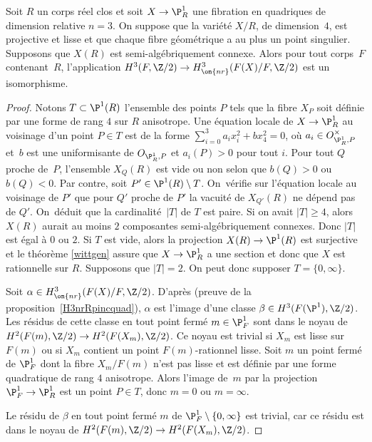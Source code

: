\begin{prop}\label{fibP1Rrel3}
Soit $R$ un corps réel clos et soit $X\to \P^1_{R}$ une fibration en quadriques de dimension relative $n= 3$.
On suppose que la variété $X/R$, de dimension~$4$, est projective et lisse
et que chaque fibre géométrique a au plus un point singulier. Supposons que $X(R)$ est semi-algébriquement connexe.
Alors pour tout corps~$F$ contenant~$R$,
l'application $H^3(F,\Z/2) \to H^3_{\on{nr}}(F(X)/F, \Z/2)$ est
un isomorphisme.
\end{prop}
\begin{proof}

Notons $T\subset \P^1(R)$ l'ensemble des points $P$ tels que la fibre $X_P$ soit définie par une forme de rang $4$ sur $R$ anisotrope. Une équation locale de $X\to \P^1_R$ au voisinage d'un point $P\in T$ est de la forme $\sum_{i=0}^3 a_ix_i^2+bx_4^2=0$, où $a_i\in O_{\P^1_R,P}^\times$ et~$b$ est une uniformisante de $O_{\P^1_R,P}$ et $a_i(P)>0$ pour tout $i$.
Pour tout $Q$ proche de~$P$, l'ensemble $X_Q(R)$ est vide ou non selon que $b(Q)>0$ ou $b(Q)<0$. Par contre, soit $P'\in \P^1(R)\setminus T$. On~vérifie sur l'équation locale au voisinage de $P'$ que pour $Q'$ proche de $P'$ la vacuité de $X_{Q'}(R)$ ne dépend pas de $Q'$. On~déduit que la cardinalité~$|T|$ de $T$ est paire. Si on avait $|T|\geq 4$, alors $X(R)$ aurait au moins $2$ composantes semi-algébriquement connexes. Donc $|T|$ est égal à $0$ ou $2$. Si $T$ est vide, alors la projection $X(R) \to \P^1(R)$ est surjective
et le théorème \ref{wittgen} assure que $X \to \P^1_{R}$ a une section
et donc que $X$ est rationnelle sur $R$.
Supposons que $|T|=2$.
On peut donc supposer $T=\{0,\infty\}$.

Soit $\alpha \in H^3_{\on{nr}}(F(X)/F, \Z/2)$. D'après \cite[Th.\,5]{kahn1998unramified} (\cf preuve de la proposition~\ref{H3nrRpincquad}),
$\alpha$ est l'image d'une classe $\beta \in H^3(F(\P^1),\Z/2)$.
Les résidus de cette classe en tout point fermé $m \in \P^1_{F}$
sont dans le noyau de $H^2(F(m), \Z/2) \to H^2(F(X_{m}), \Z/2)$.
Ce noyau est trivial si $X_{m}$ est lisse sur $F(m)$ ou si $X_m$ contient un point
$F(m)$\nobreakdash-rationnel lisse. Soit $m$ un point fermé de $\P^1_{F}$
dont la fibre $X_{m}/F(m)$ n'est pas lisse et est définie par
une forme quadratique de rang $4$ anisotrope.
Alors l'image de~$m$ par la projection $\P^1_{F}\to \P^1_{R}$ est
un point $P\in T$, donc $m=0$ ou $m=\infty$.

Le résidu de $\beta$ en tout point fermé $m$ de $\P^1_{F}\setminus \{0,\infty\}$ est trivial, car ce résidu est
dans le noyau de $H^2(F(m),\Z/2) \to H^2(F(X_{m}),\Z/2)$.


\end{proof}
